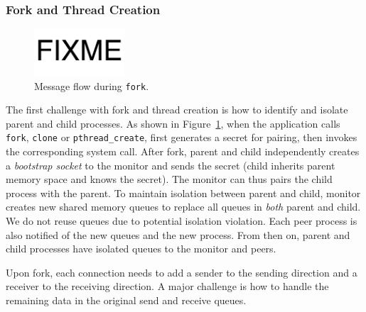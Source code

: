 \subsubsection{Fork and Thread Creation}
\label{subsubsec:fork_fork}


\begin{figure}[t]
	\centering
	\includegraphics[width=0.3\textwidth]{images/fixme}
	\caption{Message flow during \texttt{fork}.}
	\label{fig:fork-fork}
\end{figure}


The first challenge with fork and thread creation is how to identify and isolate parent and child processes. As shown in Figure~\ref{fig:fork-fork}, when the application calls \texttt{fork}, \texttt{clone} or \texttt{pthread\_create}, \libipc{} first generates a secret for pairing, then invokes the corresponding system call. After fork, parent and child independently creates a \textit{bootstrap socket} to the monitor and sends the secret (child inherits parent memory space and knows the secret). The monitor can thus pairs the child process with the parent. 
To maintain isolation between parent and child, monitor creates new shared memory queues to replace all queues in \emph{both} parent and child. We do not reuse queues due to potential isolation violation. %
Each peer process is also notified of the new queues and the new process. From then on, parent and child processes have isolated queues to the monitor and peers.

Upon fork, each connection needs to add a sender to the sending direction and a receiver to the receiving direction. A major challenge is how to handle the remaining data in the original send and receive queues.


